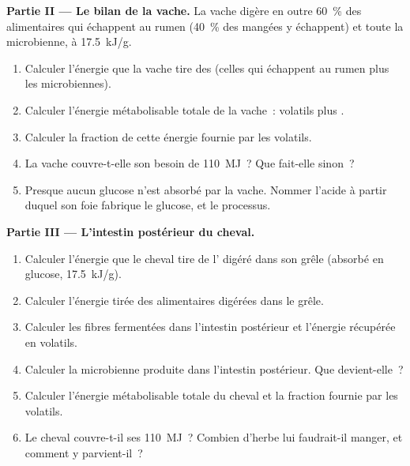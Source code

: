 \begin{problem}
\medskip
\noindent\textbf{Partie II --- Le bilan de la vache.}
La vache digère en outre \qty{60}{\%} des  alimentaires qui
échappent au rumen (\qty{40}{\%} des  mangées y échappent) et
toute la  microbienne, à \qty{17.5}{kJ/g}.
\begin{enumerate}[resume]
  \item Calculer l'énergie que la vache tire des  (celles qui
        échappent au rumen plus les microbiennes).
  \item Calculer l'énergie métabolisable totale de la vache~:  volatils plus .
  \item Calculer la fraction de cette énergie fournie par les  volatils.
  \item La vache couvre-t-elle son besoin de \qty{110}{MJ}~? Que
        fait-elle sinon~?
  \item Presque aucun glucose n'est absorbé par la vache. Nommer
        l'acide à partir duquel son foie fabrique le glucose, et le
        processus.
\end{enumerate}

\medskip
\noindent\textbf{Partie III --- L'intestin postérieur du cheval.}
\begin{enumerate}[resume]
  \item Calculer l'énergie que le cheval tire de l' digéré dans
        son grêle (absorbé en glucose, \qty{17.5}{kJ/g}).
  \item Calculer l'énergie tirée des  alimentaires digérées
        dans le grêle.
  \item Calculer les fibres fermentées dans l'intestin postérieur et
        l'énergie récupérée en  volatils.
  \item Calculer la  microbienne produite dans l'intestin
        postérieur. Que devient-elle~?
  \item Calculer l'énergie métabolisable totale du cheval et la
        fraction fournie par les  volatils.
  \item Le cheval couvre-t-il ses \qty{110}{MJ}~? Combien d'herbe lui
        faudrait-il manger, et comment y parvient-il~?
\end{enumerate}


\end{problem}
